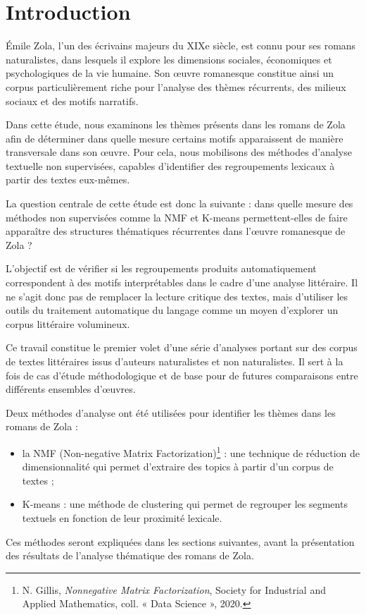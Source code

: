 \section{Introduction}

Émile Zola, l'un des écrivains majeurs du XIXe siècle, est connu pour ses romans naturalistes, dans lesquels il explore les dimensions sociales, économiques et psychologiques de la vie humaine. Son œuvre romanesque constitue ainsi un corpus particulièrement riche pour l'analyse des thèmes récurrents, des milieux sociaux et des motifs narratifs.

Dans cette étude, nous examinons les thèmes présents dans les romans de Zola afin de déterminer dans quelle mesure certains motifs apparaissent de manière transversale dans son œuvre. Pour cela, nous mobilisons des méthodes d'analyse textuelle non supervisées, capables d'identifier des regroupements lexicaux à partir des textes eux-mêmes.

La question centrale de cette étude est donc la suivante : dans quelle mesure des méthodes non supervisées comme la NMF et K-means permettent-elles de faire apparaître des structures thématiques récurrentes dans l'œuvre romanesque de Zola ?

L'objectif est de vérifier si les regroupements produits automatiquement correspondent à des motifs interprétables dans le cadre d'une analyse littéraire. Il ne s'agit donc pas de remplacer la lecture critique des textes, mais d'utiliser les outils du traitement automatique du langage comme un moyen d'explorer un corpus littéraire volumineux.

Ce travail constitue le premier volet d'une série d'analyses portant sur des corpus de textes littéraires issus d'auteurs naturalistes et non naturalistes. Il sert à la fois de cas d'étude méthodologique et de base pour de futures comparaisons entre différents ensembles d'œuvres.

Deux méthodes d'analyse ont été utilisées pour identifier les thèmes dans les romans de Zola :

\begin{itemize}
    \item la NMF (Non-negative Matrix Factorization)\footnote{N. Gillis, \textit{Nonnegative Matrix Factorization}, Society for Industrial and Applied Mathematics, coll. « Data Science », 2020.} : une technique de réduction de dimensionnalité qui permet d'extraire des topics à partir d'un corpus de textes ;
    \item K-means : une méthode de clustering qui permet de regrouper les segments textuels en fonction de leur proximité lexicale.
\end{itemize}

Ces méthodes seront expliquées dans les sections suivantes, avant la présentation des résultats de l'analyse thématique des romans de Zola.
